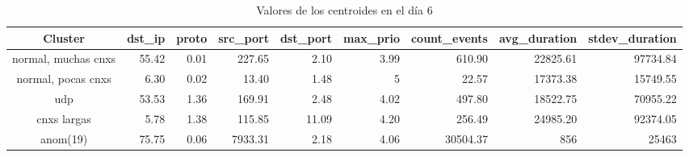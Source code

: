 \begin{table}[h!]
    \begingroup
    \setlength{\tabcolsep}{2pt} %
    \renewcommand{\arraystretch}{2} %
    \hspace*{-3cm}
    \begin{tabular}{|c|r|r|r|r|r|r|r|r|}
    \hline
    \textbf{Cluster}    & \textbf{dst\_ip} & \textbf{proto} & \textbf{src\_port} & \textbf{dst\_port} & \textbf{max\_prio} & \textbf{count\_events} & \textbf{avg\_duration} & \textbf{stdev\_duration} \\ \hline
    normal, muchas cnxs & 55.42            & 0.01           & 227.65             & 2.10               & 3.99               & 610.90                 & 22825.61               & 97734.84                 \\ \hline
    normal, pocas cnxs  & 6.30             & 0.02           & 13.40              & 1.48               & 5                  & 22.57                  & 17373.38               & 15749.55                 \\ \hline
    udp                 & 53.53            & 1.36           & 169.91             & 2.48               & 4.02               & 497.80                 & 18522.75               & 70955.22                 \\ \hline
    cnxs largas         & 5.78             & 1.38           & 115.85             & 11.09              & 4.20               & 256.49                 & 24985.20               & 92374.05                 \\ \hline
    anom(19)            & 75.75            & 0.06           & 7933.31            & 2.18               & 4.06               & 30504.37               & 856                    & 25463                    \\ \hline
    \end{tabular}
    \endgroup
\bigskip
\caption{Valores de los centroides en el día 6}
\bigskip
\label{tab:dia6}
\end{table}

